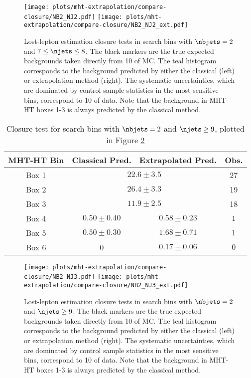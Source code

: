 \begin{figure}
  \begin{center}
    \texttt{[image: plots/mht-extrapolation/compare-closure/NB2\_NJ2.pdf]} 
    \texttt{[image: plots/mht-extrapolation/compare-closure/NB2\_NJ2\_ext.pdf]}
  \caption{
      Lost-lepton estimation closure tests in search bins with $\nbjets=2$ and $7\leq\njets\leq8$.  The black markers are the true expected backgrounds taken directly from 10 \fbinv of \ttbar MC.  The teal histogram corresponds to the background predicted by either the classical (left) or extrapolation method (right).  The systematic uncertainties, which are dominated by control sample statistics in the most sensitive bins, correspond to 10 \invfb of data.  Note that the background in MHT-HT boxes 1-3 is always predicted by the classical method.
    }
    \label{fig:ll-closure-nb2-nj2}
  \end{center}
\end{figure}
\clearpage

\begin{table}[h]\centering
  \caption{Closure test for search bins with $\nbjets=2$ and $\njets\geq9$, plotted in Figure \ref{fig:ll-closure-nb2-nj3}}
  \begin{tabular}{|c|c|c|c|}
    \hline
    MHT-HT Bin & Classical Pred. & Extrapolated Pred. & Obs.  \\ \hline
Box 1 & \multicolumn{2}{c|}{$22.6\pm3.5$} &  27 \\
Box 2 & \multicolumn{2}{c|}{$26.4\pm3.3$} &  19 \\
Box 3 & \multicolumn{2}{c|}{$11.9\pm2.5$} &  18 \\
\hline
Box 4 & $0.50\pm0.40$ & $0.58\pm0.23$ & $  1$  \\
Box 5 & $0.50\pm0.30$ & $1.68\pm0.71$ & $  1$  \\
Box 6 & 0 & $0.17\pm0.06$ & $  0$ \\
    \hline  \end{tabular}
    \label{tab:ll-closure-nb2-nj3}
\end{table}

\begin{figure}
  \begin{center}
    \texttt{[image: plots/mht-extrapolation/compare-closure/NB2\_NJ3.pdf]} 
    \texttt{[image: plots/mht-extrapolation/compare-closure/NB2\_NJ3\_ext.pdf]}
  \caption{
      Lost-lepton estimation closure tests in search bins with $\nbjets=2$ and $\njets\geq9$.  The black markers are the true expected backgrounds taken directly from 10 \fbinv of \ttbar MC.  The teal histogram corresponds to the background predicted by either the classical (left) or extrapolation method (right).  The systematic uncertainties, which are dominated by control sample statistics in the most sensitive bins, correspond to 10 \invfb of data.  Note that the background in MHT-HT boxes 1-3 is always predicted by the classical method.
    }
    \label{fig:ll-closure-nb2-nj3}
  \end{center}
\end{figure}
\clearpage


